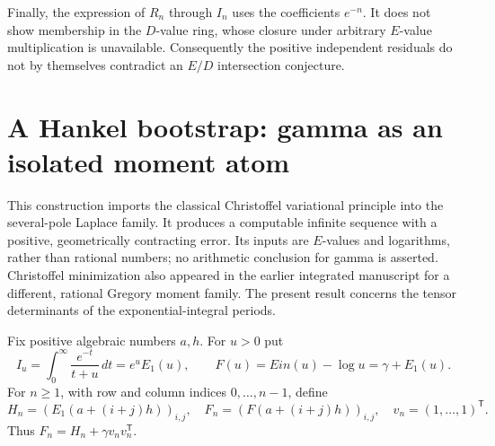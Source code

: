 \documentclass[11pt,a4paper]{article}
\theoremstyle{definition}
\theoremstyle{remark}
\theoremstyle{plain}
\numberwithin{equation}{section}
\def\operatorname#1{#1}\def\mathrm#1{#1}}
\begin{document}
Finally, the expression of $R_n$ through $I_n$ uses the coefficients
$e^{-n}$. It does not show membership in the $D$-value ring, whose
closure under arbitrary $E$-value multiplication is unavailable.
Consequently the positive independent residuals do not by themselves
contradict an $E/D$ intersection conjecture.

\section{A Hankel bootstrap: gamma as an isolated moment atom}
\label{em:sec:borel-bootstrap}

This construction imports the classical Christoffel variational principle
into the several-pole Laplace family.  It produces a computable infinite
sequence with a positive, geometrically contracting error.  Its inputs are
$E$-values and logarithms, rather than rational numbers; no arithmetic
conclusion for gamma is asserted.  Christoffel minimization also appeared
in the earlier integrated manuscript for a different, rational Gregory
moment family.  The present result concerns the tensor determinants of
the exponential-integral periods.

Fix positive algebraic numbers $a,h$.  For $u>0$ put
\[
 I_u=\int_0^\infty\frac{e^{-t}}{t+u}\,dt=e^uE_1(u),\qquad
 F(u)=\operatorname{Ein}(u)-\log u=\gamma+E_1(u).
\]
For $n\ge1$, with row and column indices $0,\ldots,n-1$, define
\[
 H_n=(E_1(a+(i+j)h))_{i,j},\quad
 F_n=(F(a+(i+j)h))_{i,j},\quad
 v_n=(1,\ldots,1)^{\mathsf T}.
\]
Thus $F_n=H_n+\gamma v_nv_n^{\mathsf T}$.
\end{document}
